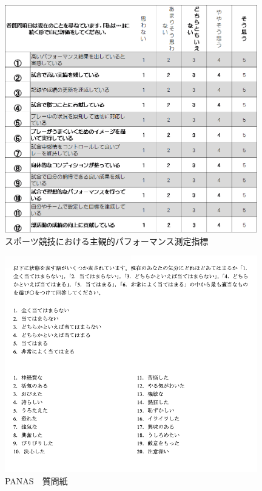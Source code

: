 \documentclass[12pt,a4paper,xelatex,ja=standard]{bxjsarticle}
\begin{document}
\begin{figure}[H]
\centering
\includegraphics[clip,width = 11cm]{question/sq.png}
\caption{スポーツ競技における主観的パフォーマンス測定指標}
\end{figure}

\begin{figure}[H]
\centering
\includegraphics[clip,width = 11cm]{question/pq.png}
\caption{PANAS　質問紙}
\end{figure}
\end{document}
